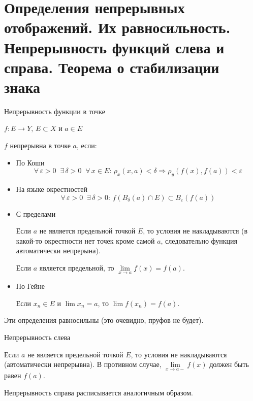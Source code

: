 \section{Определения непрерывных отображений. Их равносильность. Непрерывность функций слева и справа. Теорема о стабилизации знака}

\begin{conj}
    Непрерывность функции в точке
\end{conj}
$f : E \to Y, \, E \subset X$ и $a \in E$

$f$ непрерывна в точке $a$, если:
\begin{itemize}
    \item По Коши
    \[ \forall \, \varepsilon > 0 \;\; \exists \, \delta > 0 \;\; \forall \, x \in E : \, \rho_x(x, a) < \delta \Rightarrow \rho_y(f(x), f(a)) < \varepsilon \]
    \item На языке окрестностей
    \[ \forall \, \varepsilon > 0 \;\; \exists \, \delta > 0 : \, f(B_{\delta}(a) \cap E) \subset B_{\varepsilon}(f(a)) \]
    \item С пределами
    
    Если $a$ не является предельной точкой $E$, то условия не накладываются (в какой-то окрестности нет точек кроме самой $a$, следовательно функция автоматически непрерына).

    Если $a$ является предельной, то $\lim\limits_{x \to a} f(x) = f(a)$.
    \item По Гейне
    
    Если $x_n \in E$ и $\lim x_n = a$, то $\lim f(x_n) = f(a)$.
\end{itemize}
\begin{notice}
    Эти определения равносильны (это очевидно, пруфов не будет).
\end{notice}

\begin{conj}
    Непрерывность слева

    Если $a$ не является предельной точкой $E$, то условия не накладываются (автоматически непрерывна). 
    В противном случае, $\lim\limits_{x \to a-} f(x)$ должен быть равен $f(a)$. 
\end{conj}
\begin{notice}
    Непрерывность справа расписывается аналогичным образом.
\end{notice}

